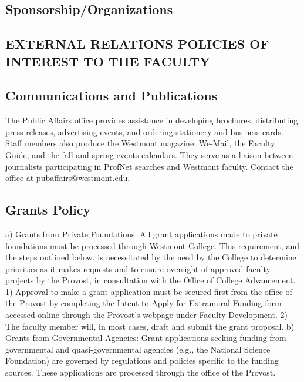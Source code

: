 \documentclass[letterpaper, 11pt]{article}
\begin{document}
	\subsection{Sponsorship/Organizations}

	\subsection{EXTERNAL RELATIONS POLICIES OF INTEREST TO THE FACULTY}
	\subsection{Communications and Publications}
		The Public Affairs office provides assistance in developing brochures, distributing press releases, advertising events, and ordering stationery and business cards. Staff members also produce the Westmont magazine, We-Mail, the Faculty Guide, and the fall and spring events calendars.  They serve as a liaison between journalists participating in ProfNet searches and Westmont faculty. Contact the office at pubaffairs@westmont.edu.
	\subsection{Grants Policy}
		a) Grants from Private Foundations:  All grant applications made to private foundations must be processed through Westmont College.  This requirement, and the steps outlined below, is necessitated by the need by the College to determine priorities as it makes requests and to ensure oversight of approved faculty projects by the Provost, in consultation with the Office of College Advancement.
		1) Approval to make a grant application must be secured first from the office of the Provost by completing the Intent to Apply for Extramural Funding form accessed online through the Provost's webpage under Faculty Development.
		2)  The faculty member will, in most cases, draft and submit the grant proposal.
		b) Grants from Governmental Agencies:  Grant applications seeking funding from governmental and quasi-governmental agencies (e.g., the National Science Foundation) are governed by regulations and policies specific to the funding sources. These applications are processed through the office of the Provost.
\end{document}
